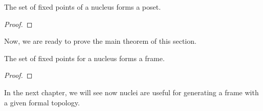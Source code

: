 \begin{prop}
  The set of fixed points of a nucleus forms a poset.
\end{prop}
\begin{proof}
\end{proof}

Now, we are ready to prove the main theorem of this section.

\begin{thm}\label{thm:fixed-point-frame}
  The set of fixed points for a nucleus forms a frame.
\end{thm}
\begin{proof}
\end{proof}

In the next chapter, we will see now nuclei are useful for generating a frame with a given
formal topology.

